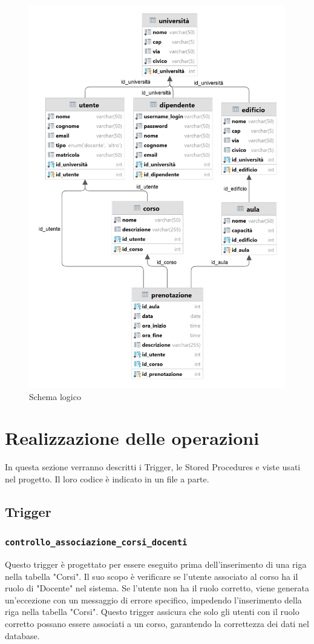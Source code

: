 \documentclass[a4paper, 10pt, oneside]{article} %
\begin{document}
\begin{figure}[h]
  \centering
\includegraphics[width=.62\textwidth]{logico.png}
  \caption{Schema logico}
\end{figure}





\section{Realizzazione delle operazioni}

In questa sezione verranno descritti i Trigger, le Stored Procedures e viste usati nel progetto. Il loro codice è indicato in un file a parte.

\subsection{Trigger}

\subsubsection*{\texttt{controllo\_associazione\_corsi\_docenti}}

Questo trigger è progettato per essere eseguito prima dell'inserimento di una riga nella tabella "Corsi". Il suo scopo è verificare se l'utente associato al corso ha il ruolo di "Docente" nel sistema. Se l'utente non ha il ruolo corretto, viene generata un'eccezione con un messaggio di errore specifico, impedendo l'inserimento della riga nella tabella "Corsi". Questo trigger assicura che solo gli utenti con il ruolo corretto possano essere associati a un corso, garantendo la correttezza dei dati nel database.\\
\end{document}
